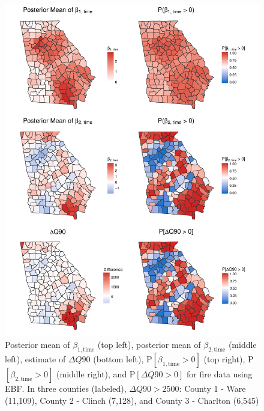 \documentclass[11pt]{article}
\begin{document}
\begin{figure}[htbp]  %
  \centering
  \includegraphics[height=0.9\textheight]{plots/fire-ebf-postpanel.pdf}
  \caption{Posterior mean of $\beta_{1, \text{time}}$ (top left), posterior mean of $\beta_{2, \text{time}}$ (middle left), estimate of $\Delta Q90$ (bottom left), P$[\beta_{1, \text{time}} > 0]$ (top right), P$[\beta_{2, \text{time}} > 0]$ (middle right), and P$[\Delta Q90 > 0]$ for fire data using EBF. In three counties (labeled), $\Delta Q90 > 2500$: County 1 - Ware (11,109), County 2 - Clinch (7,128), and County 3 - Charlton (6,545)}
  \label{ebfig:fire-ebf-postpanel}
\end{figure}

\end{document}
